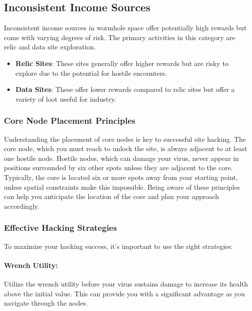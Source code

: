 \documentclass[a4paper,12pt]{article}
\begin{document}
\subsection{Inconsistent Income Sources}

Inconsistent income sources in wormhole space offer potentially high rewards but come with varying degrees of risk. The primary activities in this category are relic and data site exploration.

\begin{itemize}
    \item \textbf{Relic Sites}: These sites generally offer higher rewards but are risky to explore due to the potential for hostile encounters.
    \item \textbf{Data Sites}: These offer lower rewards compared to relic sites but offer a variety of loot useful for industry.
\end{itemize}

\subsubsection{Core Node Placement Principles}

Understanding the placement of core nodes is key to successful site hacking. The core node, which you must reach to unlock the site, is always adjacent to at least one hostile node. Hostile nodes, which can damage your virus, never appear in positions surrounded by six other spots unless they are adjacent to the core. Typically, the core is located six or more spots away from your starting point, unless spatial constraints make this impossible. Being aware of these principles can help you anticipate the location of the core and plan your approach accordingly.

\subsubsection{Effective Hacking Strategies}

To maximize your hacking success, it’s important to use the right strategies:

\paragraph{Wrench Utility:} Utilize the wrench utility before your virus sustains damage to increase its health above the initial value. This can provide you with a significant advantage as you navigate through the nodes.
\end{document}
